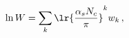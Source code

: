 \begin{equation}
\label{WilsonExponentiation}
\ln W = \sum_k \lr{ \frac{\alpha_s N_c}{\pi} }^k w_k \,,
\end{equation}

